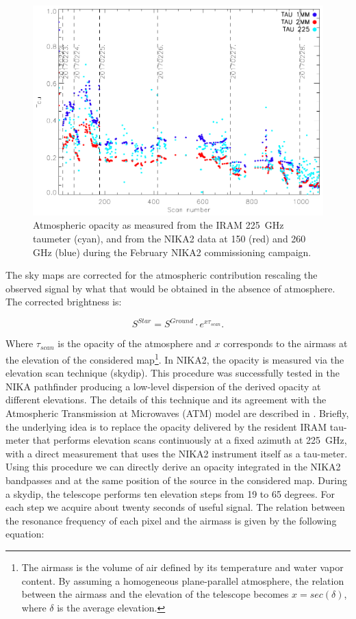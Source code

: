 \documentclass[]{aa} %
\begin{document}
\begin{figure}
\includegraphics[scale=0.55]{./opacity_evol_run22.pdf}
\caption{Atmospheric opacity as measured from the IRAM 225~GHz taumeter (cyan), and from the NIKA2 data at 150 (red) and 260 GHz (blue) during the February NIKA2 commissioning campaign. \label{fig:taumeas}}
\end{figure}

The sky maps are corrected for the atmospheric contribution rescaling the observed signal by what that would be obtained in the absence of atmosphere. The corrected brightness is:

\begin{equation}
S^{Star} =  S^{Ground} \cdot e^{ x \tau_{scan}}.
\end{equation}

Where $\tau_{scan}$ is the opacity of the atmosphere and $x$ corresponds to the airmass at the elevation of the considered map\footnote{The airmass is the volume of air defined by its temperature and water vapor content. By assuming a homogeneous plane-parallel atmosphere, the relation between the airmass and the elevation of the telescope becomes $x = sec(\delta)$, where $\delta$ is the average elevation.}.
In NIKA2, the opacity is measured via the elevation scan technique (skydip). This procedure was successfully tested in the NIKA pathfinder producing a low-level dispersion of the derived opacity at different elevations. The details of this technique and its agreement with the Atmospheric Transmission at Microwaves (ATM) model \cite{2001IEEE....49.1683C} are described in \cite{Catalano2014}. Briefly, the underlying idea is to replace the opacity delivered by the resident IRAM tau-meter that performs elevation scans continuously at a fixed azimuth at 225~GHz, with a direct measurement that uses the NIKA2 instrument itself as a tau-meter. Using this procedure we can directly derive an opacity integrated in the NIKA2 bandpasses and at the same position of the source in the considered map. 
During a skydip, the telescope performs ten elevation steps from 19 to 65 degrees. For each step we acquire about twenty seconds of useful signal. The relation between the resonance frequency of each pixel and the airmass is given by the following equation:
\end{document}
